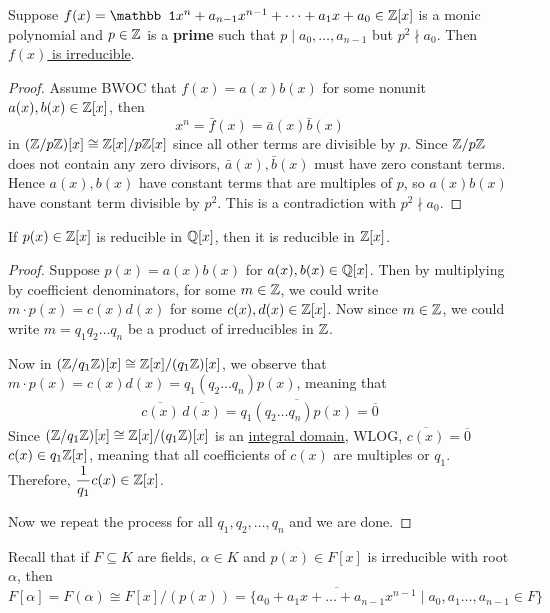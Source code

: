 \documentclass[12pt]{article}
\begin{document}
    \begin{proposition}
        Suppose $f(x)=\mathbb1x^n+a_{n-1}x^{n-1}+\dots + a_1x+a_0\in \Z[x]$ is a monic polynomial and $p\in \mathbb{Z}$ is a \textbf{prime} such that $p\mid a_0,\dots,a_{n-1}$ but $p^2\nmid a_0$. Then \underline{$f(x)$ is irreducible}.
    \end{proposition}
    \begin{proof}
        Assume BWOC that $f(x)=a(x)b(x)$ for some nonunit $a(x),b(x)\in \mathbb{Z}[x]$, then $$x^n=\bar f(x)=\bar a(x) \bar b(x)$$
        in $(\mathbb{Z}/p\mathbb{Z})[x]\cong \mathbb{Z}[x]/p\mathbb{Z}[x]$ since all other terms are divisible by $p$. Since $\mathbb{Z}/p\mathbb{Z}$ does not contain any zero divisors, $\bar a(x), \bar b(x)$ must have zero constant terms. Hence $a(x),b(x)$ have constant terms that are multiples of $p$, so $a(x)b(x)$ have constant term divisible by $p^2$. This is a contradiction with $p^2\nmid a_0$.
    \end{proof}

    \begin{lemma}
        If $p(x)\in \mathbb{Z}[x]$ is reducible in $\mathbb{Q}[x]$, then it is reducible in $\mathbb{Z}[x]$.
    \end{lemma}
    \begin{proof}
        Suppose $p(x)=a(x)b(x)$ for $a(x),b(x)\in \mathbb{Q}[x]$. Then by multiplying by coefficient denominators, for some $m\in \mathbb{Z}$, we could write $m\cdot p(x)= c(x)d(x)$ for some $c(x),d(x)\in \mathbb{Z}[x]$. Now since $m\in \mathbb{Z}$, we could write $m=q_1q_2\dots q_n$ be a product of irreducibles in $\mathbb{Z}$.
        
        Now in $(\mathbb{Z}/q_1\mathbb{Z})[x]\cong \mathbb{Z}[x]/(q_1\mathbb{Z})[x]$, we observe that $m\cdot p(x)= c(x)d(x)=q_1(q_2\dots q_n)p(x)$, meaning that \begin{align*}
            \overline{c(x)}\,\overline{d(x)}=\overline{q_1(q_2\dots q_n)p(x)}=\overline 0
        \end{align*}
        Since $(\mathbb{Z}/q_1\mathbb{Z})[x]\cong \mathbb{Z}[x]/(q_1\mathbb{Z})[x]$ is an \uline{integral domain}, WLOG, $\overline{c(x)}=\overline 0$ \ifnif $c(x)\in q_1\mathbb{Z}[x]$, meaning that all coefficients of $c(x)$ are multiples or $q_1$. Therefore, $\dfrac{1}{q_1}c(x)\in \mathbb{Z}[x]$.

        Now we repeat the process for all $q_1,q_2,\dots ,q_n$ and we are done.
    \end{proof}

    Recall that if $F\subseteq K$ are fields, $\alpha\in K$ and $p(x)\in F[x]$ is irreducible with root $\alpha$, then $$F[\alpha]=F(\alpha)\cong F[x]/(p(x))=\{\overline{a_0+a_1x+\dots+a_{n-1}x^{n-1}}\mid a_0,a_1\dots,a_{n-1}\in F\}$$
\end{document}
